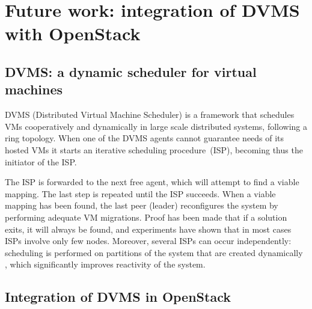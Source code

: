 \section{Future work: integration of DVMS with OpenStack}
\label{sec:future_work}

\subsection{DVMS: a dynamic scheduler for virtual machines}






DVMS \cite{quesnel:ispa2013} (Distributed Virtual Machine 
Scheduler) is a framework that schedules VMs cooperatively and dynamically in
large scale distributed systems, following a ring topology. When one of the DVMS
agents cannot guarantee needs of its hosted VMs it starts an iterative 
scheduling procedure~(ISP), becoming thus the initiator of the ISP.

The ISP is forwarded to the next free agent, which will attempt to find a viable
mapping. The last step is repeated until the ISP succeeds. When a viable mapping
has been found, the last peer (leader) reconfigures the system by performing 
adequate VM migrations. Proof has been made that if a solution exits, it will
always be found, and experiments have shown that in most cases ISPs involve 
only few nodes. Moreover, several ISPs can occur independently:
scheduling is performed on partitions of the system that are created dynamically
, which significantly improves reactivity of the system.


\subsection{Integration of DVMS in OpenStack}

\label{sub:sec:integration_dvms}

